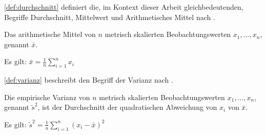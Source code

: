 \autoref{def:durchschnitt} definiert die, im Kontext dieser Arbeit gleichbedeutenden, Begriffe
Durchschnitt, Mittelwert und Arithmetisches Mittel nach \autocite[Vgl.][S.52f]{Statistik}.
\begin{definition}
    Das arithmetische Mittel von $n$ metrisch skalierten Beobachtungswerten
    $x_1,\dots,x_n$, genannt $\bar{x}$. 

    Es gilt: $\bar{x} = \frac{1}{n} \displaystyle\sum^{n}_{i=1}x_i$

    \label{def:durchschnitt}
\end{definition}

\autoref{def:varianz} beschreibt den Begriff der Varianz nach
\autocite[Vgl.][S.399]{CorrelationBetweenRelatives}.
\begin{definition}
    Die empirische Varianz von $n$ metrisch skalierten Beobachtungswerten $x_1,
    \dots, x_n$, genannt $\tilde{s}^2$, ist der Durchschnitt der quadratischen
    Abweichung von $x_i$ von $\bar{x}$.

    Es gilt: $\tilde{s}^2 = \frac{1}{n} \displaystyle\sum^{n}_{i=1}(x_i - \bar{x})^2 $
    \label{def:varianz}
\end{definition}
